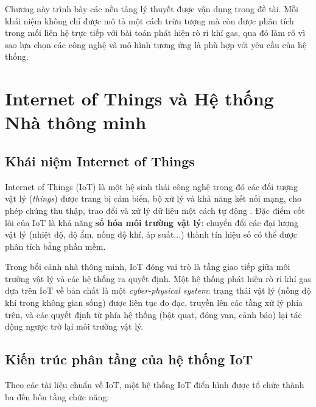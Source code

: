 
Chương này trình bày các nền tảng lý thuyết được vận dụng trong đề tài. Mỗi khái niệm không chỉ được mô tả một cách trừu tượng mà còn được phân tích trong mối liên hệ trực tiếp với bài toán phát hiện rò rỉ khí gas, qua đó làm rõ vì sao lựa chọn các công nghệ và mô hình tương ứng là phù hợp với yêu cầu của hệ thống.

\section{Internet of Things và Hệ thống Nhà thông minh}

\subsection{Khái niệm Internet of Things}

Internet of Things (IoT) là một hệ sinh thái công nghệ trong đó các đối tượng vật lý (\textit{things}) được trang bị cảm biến, bộ xử lý và khả năng kết nối mạng, cho phép chúng thu thập, trao đổi và xử lý dữ liệu một cách tự động \cite{nwazor2023}. Đặc điểm cốt lõi của IoT là khả năng \textbf{số hóa môi trường vật lý}: chuyển đổi các đại lượng vật lý (nhiệt độ, độ ẩm, nồng độ khí, áp suất...) thành tín hiệu số có thể được phân tích bằng phần mềm.

Trong bối cảnh nhà thông minh, IoT đóng vai trò là tầng giao tiếp giữa môi trường vật lý và các hệ thống ra quyết định. Một hệ thống phát hiện rò rỉ khí gas dựa trên IoT về bản chất là một \textit{cyber-physical system}: trạng thái vật lý (nồng độ khí trong không gian sống) được liên tục đo đạc, truyền lên các tầng xử lý phía trên, và các quyết định từ phía hệ thống (bật quạt, đóng van, cảnh báo) lại tác động ngược trở lại môi trường vật lý.

\subsection{Kiến trúc phân tầng của hệ thống IoT}

Theo các tài liệu chuẩn về IoT, một hệ thống IoT điển hình được tổ chức thành ba đến bốn tầng chức năng:

